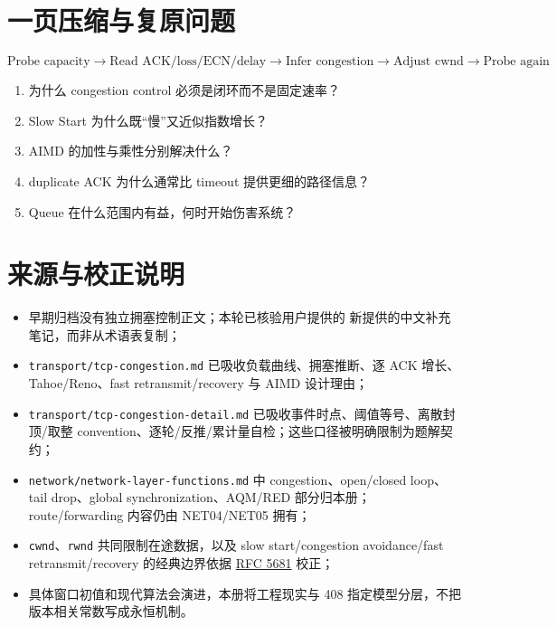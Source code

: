 \documentclass[UTF8,fontset=none,11pt,a4paper]{ctexart}
\providecommand{\tightlist}{\setlength{\itemsep}{0pt}\setlength{\parskip}{0pt}}
\providecommand{\passthrough}[1]{#1}
\begin{document}
\section{一页压缩与复原问题}\label{15-ux4e00ux9875ux538bux7f29ux4e0eux590dux539fux95eeux9898}

\[
\boxed{
\text{Probe capacity}
\to \text{Read ACK/loss/ECN/delay}
\to \text{Infer congestion}
\to \text{Adjust cwnd}
\to \text{Probe again}
}
\]

\begin{enumerate}
\def\labelenumi{\arabic{enumi}.}
\tightlist
\item
  为什么 congestion control 必须是闭环而不是固定速率？
\item
  Slow Start 为什么既``慢''又近似指数增长？
\item
  AIMD 的加性与乘性分别解决什么？
\item
  duplicate ACK 为什么通常比 timeout 提供更细的路径信息？
\item
  Queue 在什么范围内有益，何时开始伤害系统？
\end{enumerate}

\section{来源与校正说明}\label{16-ux6765ux6e90ux4e0eux6821ux6b63ux8bf4ux660e}

\begin{itemize}
\tightlist
\item
  早期归档没有独立拥塞控制正文；本轮已核验用户提供的 新提供的中文补充笔记，而非从术语表复制；
\item
  \passthrough{\lstinline!transport/tcp-congestion.md!} 已吸收负载曲线、拥塞推断、逐 ACK 增长、Tahoe/Reno、fast retransmit/recovery 与 AIMD 设计理由；
\item
  \passthrough{\lstinline!transport/tcp-congestion-detail.md!} 已吸收事件时点、阈值等号、离散封顶/取整 convention、逐轮/反推/累计量自检；这些口径被明确限制为题解契约；
\item
  \passthrough{\lstinline!network/network-layer-functions.md!} 中 congestion、open/closed loop、tail drop、global synchronization、AQM/RED 部分归本册；route/forwarding 内容仍由 NET04/NET05 拥有；
\item
  \passthrough{\lstinline!cwnd!}、\passthrough{\lstinline!rwnd!}
  共同限制在途数据，以及 slow start/congestion avoidance/fast
  retransmit/recovery 的经典边界依据
  \href{https://www.rfc-editor.org/rfc/rfc5681.html}{RFC 5681} 校正；
\item
  具体窗口初值和现代算法会演进，本册将工程现实与 408
  指定模型分层，不把版本相关常数写成永恒机制。
\end{itemize}
\end{document}

